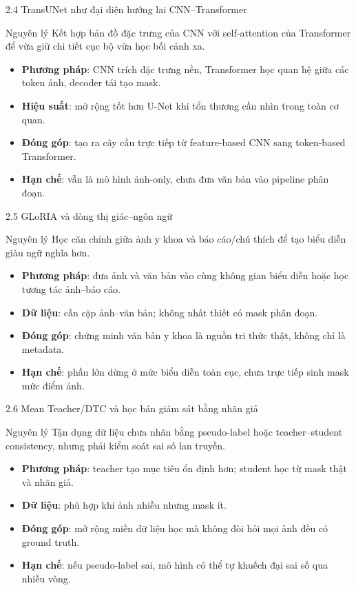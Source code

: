 \documentclass[aspectratio=169,11pt]{beamer}
\begin{document}
\begin{frame}{2.4 TransUNet như đại diện hướng lai CNN--Transformer}
  \begin{block}{Nguyên lý}
    Kết hợp bản đồ đặc trưng của CNN với self-attention của Transformer để vừa giữ chi tiết cục bộ vừa học bối cảnh xa.
  \end{block}
  \begin{itemize}
    \item \textbf{Phương pháp}: CNN trích đặc trưng nền, Transformer học quan hệ giữa các token ảnh, decoder tái tạo mask.
    \item \textbf{Hiệu suất}: mở rộng tốt hơn U-Net khi tổn thương cần nhìn trong toàn cơ quan.
    \item \textbf{Đóng góp}: tạo ra cây cầu trực tiếp từ feature-based CNN sang token-based Transformer.
    \item \textbf{Hạn chế}: vẫn là mô hình ảnh-only, chưa đưa văn bản vào pipeline phân đoạn.
  \end{itemize}
\end{frame}

\begin{frame}{2.5 GLoRIA và dòng thị giác--ngôn ngữ}
  \begin{block}{Nguyên lý}
    Học căn chỉnh giữa ảnh y khoa và báo cáo/chú thích để tạo biểu diễn giàu ngữ nghĩa hơn.
  \end{block}
  \begin{itemize}
    \item \textbf{Phương pháp}: đưa ảnh và văn bản vào cùng không gian biểu diễn hoặc học tương tác ảnh--báo cáo.
    \item \textbf{Dữ liệu}: cần cặp ảnh--văn bản; không nhất thiết có mask phân đoạn.
    \item \textbf{Đóng góp}: chứng minh văn bản y khoa là nguồn tri thức thật, không chỉ là metadata.
    \item \textbf{Hạn chế}: phần lớn dừng ở mức biểu diễn toàn cục, chưa trực tiếp sinh mask mức điểm ảnh.
  \end{itemize}
\end{frame}

\begin{frame}{2.6 Mean Teacher/DTC và học bán giám sát bằng nhãn giả}
  \begin{block}{Nguyên lý}
    Tận dụng dữ liệu chưa nhãn bằng pseudo-label hoặc teacher--student consistency, nhưng phải kiểm soát sai số lan truyền.
  \end{block}
  \begin{itemize}
    \item \textbf{Phương pháp}: teacher tạo mục tiêu ổn định hơn; student học từ mask thật và nhãn giả.
    \item \textbf{Dữ liệu}: phù hợp khi ảnh nhiều nhưng mask ít.
    \item \textbf{Đóng góp}: mở rộng miền dữ liệu học mà không đòi hỏi mọi ảnh đều có ground truth.
    \item \textbf{Hạn chế}: nếu pseudo-label sai, mô hình có thể tự khuếch đại sai số qua nhiều vòng.
  \end{itemize}
\end{frame}
\end{document}
